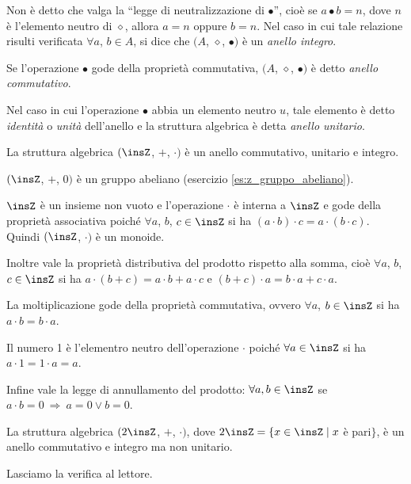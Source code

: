 Non è detto che valga la ``legge di neutralizzazione di $\bullet$'', cioè se $a \bullet b = n$, dove $n$ è l'elemento neutro di $\diamond$, allora $a = n$ oppure $b = n$. Nel caso in cui tale relazione risulti verificata $\forall a$, $b \in A$, si dice che $(A$, $\diamond$, $\bullet)$ è un \emph{anello integro}.

Se l'operazione $\bullet$ gode della proprietà commutativa, $(A$, $\diamond$, $\bullet)$ è detto \emph{anello commutativo}.

Nel caso in cui l'operazione $\bullet$ abbia un elemento neutro $u$, tale elemento è detto \emph{identità} o \emph{unità} dell'anello e la struttura algebrica è detta \emph{anello unitario}.

\begin{exrig}
 \begin{esempio}
La struttura algebrica $(\insZ$, $+$, $\cdot)$ è un anello commutativo, unitario e integro.

$(\insZ$, $+$, $0)$ è un gruppo abeliano (esercizio \ref{es:z_gruppo_abeliano}).

$\insZ$ è un insieme non vuoto e l'operazione $\cdot$ è interna a $\insZ$ e gode della proprietà associativa poiché $\forall a$, $b$, $c\in\insZ$ si ha $(a\cdot b)\cdot c=a\cdot (b\cdot c)$. Quindi $(\insZ$, $\cdot)$ è un monoide.

Inoltre vale la proprietà distributiva del prodotto rispetto alla somma, cioè $\forall a$, $b$, $c \in \insZ$ si ha $a\cdot(b+c) = a\cdot b + a\cdot c$ e $(b+c)\cdot a = b\cdot a + c\cdot a$.

La moltiplicazione gode della proprietà commutativa, ovvero $\forall a$, $b\in\insZ$ si ha $a\cdot b=b \cdot a$.

Il numero 1 è l'elementro neutro dell'operazione $\cdot$ poiché $\forall a\in\insZ$ si ha $a\cdot 1=1 \cdot a=a$.

Infine vale la legge di annullamento del prodotto: $\forall a,b\in\insZ$ se $a\cdot b =0  \:\Rightarrow\: a=0 \vee b=0$.

 \end{esempio}

 \begin{esempio}
La struttura algebrica $(2\insZ$, $+$, $\cdot)$, dove $2\insZ = \{x\in\insZ\mid x$ è pari$\}$, è un anello commutativo e integro ma non unitario.
 
Lasciamo la verifica al lettore.

 \end{esempio}
\end{exrig}

